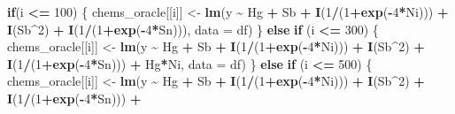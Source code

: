 \documentclass[12pt, twoside]{amherstthesis}
\newenvironment{Shaded}{\begin{snugshade}}{\end{snugshade}}
\newcommand{\AttributeTok}[1]{\textcolor[rgb]{0.13,0.29,0.53}{#1}}
\newcommand{\ControlFlowTok}[1]{\textcolor[rgb]{0.13,0.29,0.53}{\textbf{#1}}}
\newcommand{\DecValTok}[1]{\textcolor[rgb]{0.00,0.00,0.81}{#1}}
\newcommand{\FunctionTok}[1]{\textcolor[rgb]{0.13,0.29,0.53}{\textbf{#1}}}
\newcommand{\NormalTok}[1]{#1}
\newcommand{\OtherTok}[1]{\textcolor[rgb]{0.56,0.35,0.01}{#1}}
\newcommand{\SpecialCharTok}[1]{\textcolor[rgb]{0.81,0.36,0.00}{\textbf{#1}}}
\begin{document}
\begin{Shaded}
\begin{Highlighting}[]
    \ControlFlowTok{if}\NormalTok{(i }\SpecialCharTok{\textless{}=} \DecValTok{100}\NormalTok{) \{}
\NormalTok{      chems\_oracle[[i]] }\OtherTok{\textless{}{-}} \FunctionTok{lm}\NormalTok{(y }\SpecialCharTok{\textasciitilde{}}\NormalTok{ Hg }\SpecialCharTok{+}\NormalTok{ Sb }\SpecialCharTok{+}
                                \FunctionTok{I}\NormalTok{(}\DecValTok{1}\SpecialCharTok{/}\NormalTok{(}\DecValTok{1}\SpecialCharTok{+}\FunctionTok{exp}\NormalTok{(}\SpecialCharTok{{-}}\DecValTok{4}\SpecialCharTok{*}\NormalTok{Ni))) }\SpecialCharTok{+} \FunctionTok{I}\NormalTok{(Sb}\SpecialCharTok{\^{}}\DecValTok{2}\NormalTok{) }\SpecialCharTok{+} 
                                \FunctionTok{I}\NormalTok{(}\DecValTok{1}\SpecialCharTok{/}\NormalTok{(}\DecValTok{1}\SpecialCharTok{+}\FunctionTok{exp}\NormalTok{(}\SpecialCharTok{{-}}\DecValTok{4}\SpecialCharTok{*}\NormalTok{Sn))), }\AttributeTok{data =}\NormalTok{ df)}
\NormalTok{    \} }\ControlFlowTok{else} \ControlFlowTok{if}\NormalTok{ (i }\SpecialCharTok{\textless{}=} \DecValTok{300}\NormalTok{) \{}
\NormalTok{      chems\_oracle[[i]] }\OtherTok{\textless{}{-}} \FunctionTok{lm}\NormalTok{(y }\SpecialCharTok{\textasciitilde{}}\NormalTok{ Hg }\SpecialCharTok{+}\NormalTok{ Sb }\SpecialCharTok{+}
                                \FunctionTok{I}\NormalTok{(}\DecValTok{1}\SpecialCharTok{/}\NormalTok{(}\DecValTok{1}\SpecialCharTok{+}\FunctionTok{exp}\NormalTok{(}\SpecialCharTok{{-}}\DecValTok{4}\SpecialCharTok{*}\NormalTok{Ni))) }\SpecialCharTok{+} \FunctionTok{I}\NormalTok{(Sb}\SpecialCharTok{\^{}}\DecValTok{2}\NormalTok{) }\SpecialCharTok{+} \FunctionTok{I}\NormalTok{(}\DecValTok{1}\SpecialCharTok{/}\NormalTok{(}\DecValTok{1}\SpecialCharTok{+}\FunctionTok{exp}\NormalTok{(}\SpecialCharTok{{-}}\DecValTok{4}\SpecialCharTok{*}\NormalTok{Sn))) }\SpecialCharTok{+}
\NormalTok{                                Hg}\SpecialCharTok{*}\NormalTok{Ni, }\AttributeTok{data =}\NormalTok{ df)}
\NormalTok{    \} }\ControlFlowTok{else} \ControlFlowTok{if}\NormalTok{ (i }\SpecialCharTok{\textless{}=} \DecValTok{500}\NormalTok{) \{}
\NormalTok{      chems\_oracle[[i]] }\OtherTok{\textless{}{-}} \FunctionTok{lm}\NormalTok{(y }\SpecialCharTok{\textasciitilde{}}\NormalTok{ Hg }\SpecialCharTok{+}\NormalTok{ Sb }\SpecialCharTok{+}
                                \FunctionTok{I}\NormalTok{(}\DecValTok{1}\SpecialCharTok{/}\NormalTok{(}\DecValTok{1}\SpecialCharTok{+}\FunctionTok{exp}\NormalTok{(}\SpecialCharTok{{-}}\DecValTok{4}\SpecialCharTok{*}\NormalTok{Ni))) }\SpecialCharTok{+} \FunctionTok{I}\NormalTok{(Sb}\SpecialCharTok{\^{}}\DecValTok{2}\NormalTok{) }\SpecialCharTok{+} \FunctionTok{I}\NormalTok{(}\DecValTok{1}\SpecialCharTok{/}\NormalTok{(}\DecValTok{1}\SpecialCharTok{+}\FunctionTok{exp}\NormalTok{(}\SpecialCharTok{{-}}\DecValTok{4}\SpecialCharTok{*}\NormalTok{Sn))) }\SpecialCharTok{+}

\end{Highlighting}
\end{Shaded}
\end{document}
